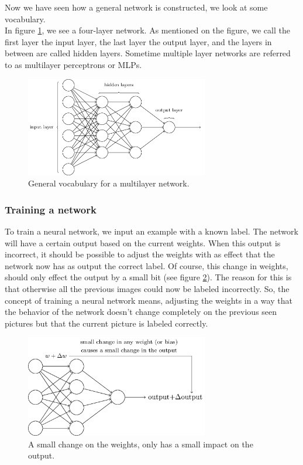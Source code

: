 Now we have seen how a general network is constructed, we look at some vocabulary. \\
In figure \ref{fig:networkArch}, we see a four-layer network. As mentioned on the figure, we call the first layer the input layer, the last layer the output layer, and the layers in between are called hidden layers. Sometime multiple layer networks are referred to as multilayer perceptrons or MLPs.

\begin{figure}[H]
	\centering
	\includegraphics[width=8cm]{networkArchitecture.png}
	\caption{General vocabulary for a multilayer network.}
	\label{fig:networkArch}
\end{figure} 		


		\subsubsection{Training a network}
		
To train a neural network, we input an example with a known label. The network will have a certain output based on the current weights. When this output is incorrect, it should be possible to adjust the weights with as effect that the network now has as output the correct label. Of course, this change in weights, should only effect the output by a small bit (see figure \ref{fig:smallChange}). The reason for this is that otherwise all the previous images could now be labeled incorrectly. So, the concept of training a neural network means, adjusting the weights in a way that the behavior of the network doesn't change completely on the previous seen pictures but that the current picture is labeled correctly.

\begin{figure}[H]
	\centering
	\includegraphics[width=8cm]{smallChange.png}
	\caption{A small change on the weights, only has a small impact on the output.}
	\label{fig:smallChange}
\end{figure} 

